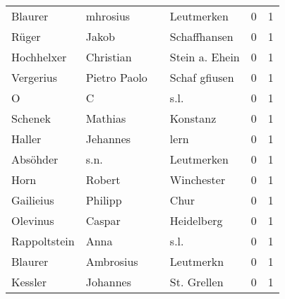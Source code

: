 \begin{center}
\begin{tiny}
\begin{longtabu}{llllrr}
                  Blaurer &                           mhrosius &             &                                  Leutmerken &          0 &         1 \\
                    Rüger &                              Jakob &             &                                Schaffhansen &          0 &         1 \\
               Hochhelxer &                          Christian &             &                              Stein a. Ehein &          0 &         1 \\
                Vergerius &                       Pietro Paolo &             &                               Schaf gfiusen &          0 &         1 \\
                        O &                                  C &             &                                        s.l. &          0 &         1 \\
                  Schenek &                            Mathias &             &                                    Konstanz &          0 &         1 \\
                   Haller &                           Jehannes &             &                                        lern &          0 &         1 \\
                 Absöhder &                               s.n. &             &                                  Leutmerken &          0 &         1 \\
                     Horn &                             Robert &             &                                  Winchester &          0 &         1 \\
                Gailieius &                            Philipp &             &                                        Chur &          0 &         1 \\
                 Olevinus &                             Caspar &             &                                  Heidelberg &          0 &         1 \\
             Rappoltstein &                               Anna &             &                                        s.l. &          0 &         1 \\
                  Blaurer &                          Ambrosius &             &                                   Leutmerkn &          0 &         1 \\
                  Kessler &                           Johannes &             &                                 St. Grellen &          0 &         1 \\

\end{longtabu}
\end{tiny}
\end{center}
